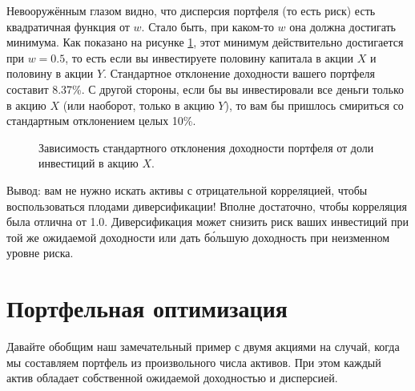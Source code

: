 Невооружённым глазом видно, что дисперсия портфеля (то есть риск) есть квадратичная функция от $w$. Стало быть, при каком-то $w$ она должна достигать минимума. Как показано на рисунке \ref{portfolio_volatility_vs_w}, этот минимум действительно достигается при $w=0.5$, то есть если вы инвестируете половину капитала в акции $X$ и половину в акции $Y$. Стандартное отклонение доходности вашего портфеля составит 8.37\%. С другой стороны, если бы вы инвестировали все деньги только в акцию $X$ (или наоборот, только в акцию $Y$), то вам бы пришлось смириться со стандартным отклонением целых 10\%.

\begin{figure}[h!]
\centering
{}
\caption{Зависимость стандартного отклонения доходности портфеля от доли инвестиций в акцию $X$.}
\label{portfolio_volatility_vs_w}
\end{figure}

Вывод: вам не нужно искать активы с отрицательной корреляцией, чтобы воспользоваться плодами диверсификации! Вполне достаточно, чтобы корреляция была отлична от 1.0. Диверсификация может снизить риск ваших инвестиций при той же ожидаемой доходности или дать б\'{о}льшую доходность при неизменном уровне риска.

\section{Портфельная оптимизация}

Давайте обобщим наш замечательный пример с двумя акциями на случай, когда мы составляем портфель из произвольного числа активов. При этом каждый актив обладает собственной ожидаемой доходностью и дисперсией.

